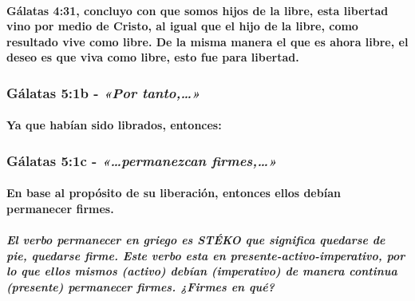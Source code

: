 \documentclass[11a pt,twoside]{article}
\newcommand{\scripture}[1]{%
  {\fontsize{12pt}{16pt}\selectfont\ScriptureFont\itshape #1}%
}
\def\textbf#1{#1}%
\let\oldsubsubsection\subsubsection
\renewcommand{\subsubsection}{\needspace{4\baselineskip}\oldsubsubsection}
\let\oldparagraph\paragraph
\renewcommand{\paragraph}{\needspace{3\baselineskip}\oldparagraph}
\let\oldsubparagraph\subparagraph
\renewcommand{\subparagraph}{\needspace{2\baselineskip}\oldsubparagraph}
\begin{document}
\paragraph{\texorpdfstring{Gálatas 4:31, concluyo con que somos hijos de
la libre, esta libertad vino por medio de Cristo, al igual que el hijo
de la libre, como resultado vive como libre. De la misma manera el que
es ahora libre, el deseo es que viva como libre, esto fue \textbf{para}
libertad.}{Gálatas 4:31, concluyo con que somos hijos de la libre, esta libertad vino por medio de Cristo, al igual que el hijo de la libre, como resultado vive como libre. De la misma manera el que es ahora libre, el deseo es que viva como libre, esto fue para libertad.}}\label{guxe1latas-431-concluyo-con-que-somos-hijos-de-la-libre-esta-libertad-vino-por-medio-de-cristo-al-igual-que-el-hijo-de-la-libre-como-resultado-vive-como-libre.-de-la-misma-manera-el-que-es-ahora-libre-el-deseo-es-que-viva-como-libre-esto-fue-para-libertad.}

\subsubsection{\texorpdfstring{Gálatas 5:1b -
\scripture{«Por tanto,…»}}{Gálatas 5:1b - }}\label{guxe1latas-51b---por-tanto}

\paragraph{Ya que habían sido librados,
entonces:}\label{ya-que-habuxedan-sido-librados-entonces}

\subsubsection{\texorpdfstring{Gálatas 5:1c -
\scripture{«…permanezcan firmes,…»}}{Gálatas 5:1c - }}\label{guxe1latas-51c---permanezcan-firmes}

\paragraph{En base al propósito de su liberación, entonces ellos debían
permanecer
firmes.}\label{en-base-al-propuxf3sito-de-su-liberaciuxf3n-entonces-ellos-debuxedan-permanecer-firmes.}

\subparagraph{\texorpdfstring{El verbo permanecer en griego es STÉKO que
significa quedarse de pie, quedarse firme. Este verbo esta en
presente-activo-imperativo, por lo que \textbf{ellos} mismos (activo)
\textbf{debían} (imperativo) de manera \textbf{continua} (presente)
permanecer firmes. ¿Firmes en
qué?}{El verbo permanecer en griego es STÉKO que significa quedarse de pie, quedarse firme. Este verbo esta en presente-activo-imperativo, por lo que ellos mismos (activo) debían (imperativo) de manera continua (presente) permanecer firmes. ¿Firmes en qué?}}\label{el-verbo-permanecer-en-griego-es-stuxe9ko-que-significa-quedarse-de-pie-quedarse-firme.-este-verbo-esta-en-presente-activo-imperativo-por-lo-que-ellos-mismos-activo-debuxedan-imperativo-de-manera-continua-presente-permanecer-firmes.-firmes-en-quuxe9}
\end{document}
